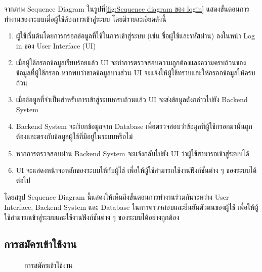 \documentclass[14pt,oneside,openright,a4paper]{cpe-thai-project}
\begin{document}
จากภาพ Sequence Diagram ในรูปที่\ref{fig:Sequence diagram ของ login} แสดงขั้นตอนการทำงานของระบบเมื่อผู้ใช้ต้องการเข้าสู่ระบบ โดยมีรายละเอียดดังนี้
  \begin{enumerate}
    \item ผู้ใช้เริ่มต้นโดยการกรอกข้อมูลที่ใช้ในการเข้าสู่ระบบ (เช่น ชื่อผู้ใช้และรหัสผ่าน) ลงในหน้า Log in ของ User Interface (UI)
    \item เมื่อผู้ใช้กรอกข้อมูลเรียบร้อยแล้ว UI จะทำการตรวจสอบความถูกต้องและความครบถ้วนของข้อมูลที่ผู้ใช้กรอก หากพบว่าขาดข้อมูลบางส่วน UI จะแจ้งให้ผู้ใช้ทราบและให้กรอกข้อมูลให้ครบถ้วน
    \item เมื่อข้อมูลที่จำเป็นสำหรับการเข้าสู่ระบบครบถ้วนแล้ว UI จะส่งข้อมูลดังกล่าวไปยัง Backend System
    \item Backend System จะเรียกข้อมูลจาก Database เพื่อตรวจสอบว่าข้อมูลที่ผู้ใช้กรอกมานั้นถูกต้องและตรงกับข้อมูลผู้ใช้ที่มีอยู่ในระบบหรือไม่
    \item หากการตรวจสอบผ่าน Backend System จะแจ้งกลับไปยัง UI ว่าผู้ใช้สามารถเข้าสู่ระบบได้
    \item UI จะแสดงหน้าจอหลักของระบบให้กับผู้ใช้ เพื่อให้ผู้ใช้สามารถใช้งานฟังก์ชันต่าง ๆ ของระบบได้ต่อไป
  \end{enumerate}
  โดยสรุป Sequence Diagram นี้แสดงให้เห็นถึงขั้นตอนการทำงานร่วมกันระหว่าง User Interface, Backend System และ Database ในการตรวจสอบและยืนยันตัวตนของผู้ใช้ เพื่อให้ผู้ใช้สามารถเข้าสู่ระบบและใช้งานฟังก์ชันต่าง ๆ ของระบบได้อย่างถูกต้อง

\subsection{การสมัครเข้าใช้งาน}

  \begin{figure}[!h]\centering
    \setlength{\fboxrule}{0.5mm} %
    \setlength{\fboxsep}{0.5cm}
    \caption{\centering การสมัครเข้าใช้งาน}\label{fig:regis}
  \end{figure}
\end{document}

